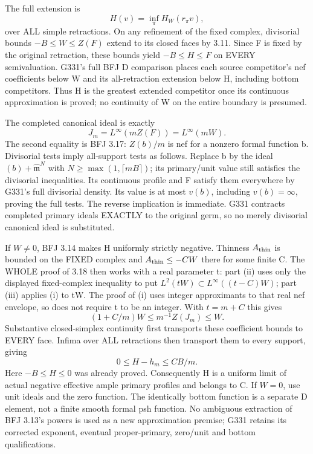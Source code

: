The full extension is
\[
                   H(v)=\inf_\pi H_W(r_\pi v),
\]
over ALL simple retractions. On any refinement of the fixed complex,
divisorial bounds $-B\le W\le Z(F)$ extend to its closed faces by 3.11.
Since F is fixed by the original retraction, these bounds yield
$-B\le H\le F$ on EVERY semivaluation. G331's full BFJ D comparison
places each source competitor's nef coefficients below W and its
all-retraction extension below H, including bottom competitors. Thus H
is the greatest extended competitor once its continuous approximation
is proved; no continuity of W on the entire boundary is presumed.

The completed canonical ideal is exactly
\[
          J_m=L^\infty(mZ(F))=L^\infty(mW).
\]
The second equality is BFJ 3.17: $Z(b)/m$ is nef for a nonzero formal
function b. Divisorial tests imply all-support tests as follows. Replace
b by the ideal $(b)+\widehat{\mathfrak m}^{N}$ with
$N\ge\max(1,\lceil mB\rceil)$; its primary/unit value still satisfies
the divisorial inequalities. Its continuous profile and F satisfy them
everywhere by G331's full divisorial density. Its value is at most $v(b)$,
including $v(b)=\infty$, proving the full tests. The reverse implication
is immediate. G331 contracts completed primary ideals EXACTLY to the
original germ, so no merely divisorial canonical ideal is substituted.

If $W\ne0$, BFJ 3.14 makes H uniformly strictly negative.
Thinness $A_{\rm thin}$ is bounded on the FIXED complex and
$A_{\rm thin}\le-CW$ there for some finite C. The WHOLE proof of 3.18
then works with a real parameter t: part (ii) uses only the displayed
fixed-complex inequality to put
$L^2(tW)\subset L^\infty((t-C)W)$; part (iii) applies (i) to tW.
The proof of (i) uses integer approximants to that real nef envelope,
so does not require t to be an integer. With $t=m+C$ this gives
\[
          (1+C/m)W\le m^{-1}Z(J_m)\le W.
\]
Substantive closed-simplex continuity first transports these coefficient
bounds to EVERY face. Infima over ALL retractions then transport them
to every support, giving
\[
                 0\le H-h_m\le CB/m.
\]
Here $-B\le H\le0$ was already proved. Consequently H is a uniform
limit of actual negative effective ample primary profiles and belongs
to C. If $W=0$, use unit ideals and the zero function. The identically
bottom function is a separate D element, not a finite smooth formal psh
function. No ambiguous extraction of BFJ 3.13's powers is used as a new
approximation premise; G331 retains its corrected exponent, eventual
proper-primary, zero/unit and bottom qualifications.

